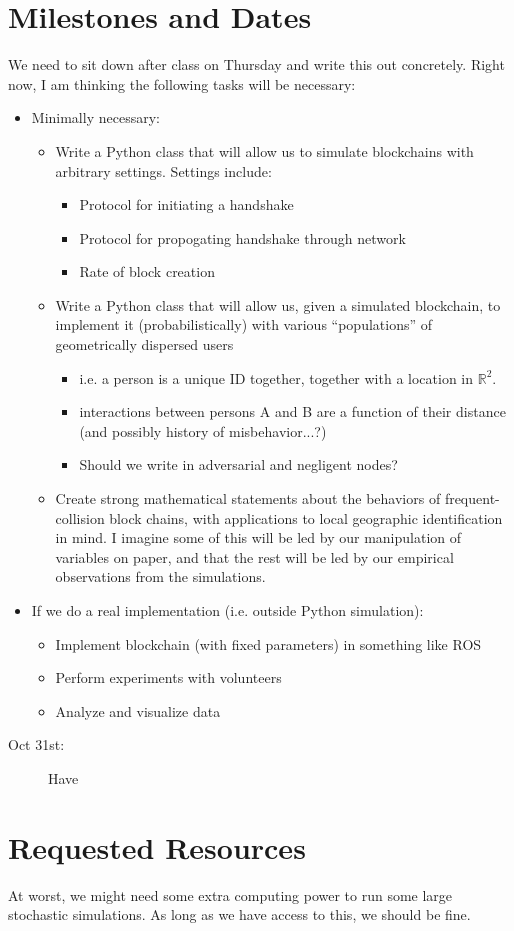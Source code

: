 \documentclass{article}
\begin{document}
\section*{Milestones and Dates}
We need to sit down after class on Thursday and write this out concretely.
Right now, I am thinking the following tasks will be necessary:
\begin{itemize}
	\item Minimally necessary:
	\begin{itemize}
		\item Write a Python class that will allow us to simulate
			blockchains with arbitrary settings. Settings include:
		\begin{itemize}
			\item Protocol for initiating a handshake
			\item Protocol for propogating handshake through network
			\item Rate of block creation
		\end{itemize}
		\item Write a Python class that will allow us, given a simulated
			blockchain, to implement it (probabilistically) with
			various ``populations'' of geometrically dispersed users
		\begin{itemize}
			\item i.e. a person is a unique ID together,
				together with a location in $\mathbb{R}^2$.
			\item interactions between persons A and B are
				a function of their distance (and possibly
				history of misbehavior...?)
			\item Should we write in adversarial and negligent nodes?
		\end{itemize}
		\item Create strong mathematical statements about
			the behaviors of frequent-collision block chains,
			with applications to local geographic identification
			in mind. I imagine some of this will be led by our
			manipulation of variables on paper,
			and that the rest will be led by our empirical
			observations from the simulations.
	\end{itemize}
	\item If we do a real implementation (i.e. outside Python simulation):
	\begin{itemize}
		\item Implement blockchain (with fixed parameters) in something
			like ROS
		\item Perform experiments with volunteers
		\item Analyze and visualize data
	\end{itemize}
\end{itemize}

\begin{description}
	\item[Oct 31st:] Have 
\end{description}

\section*{Requested Resources}
At worst, we might need some extra computing power to run some large stochastic simulations. As long as we have access to this, we should be fine.
\end{document}
